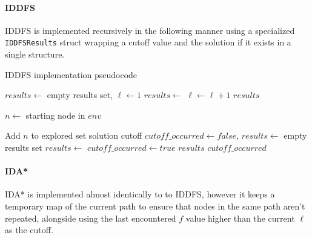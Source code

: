\paragraph{IDDFS} %
\label{par:iddfs}
IDDFS is implemented recursively in the following manner using a specialized \texttt{IDDFSResults} struct wrapping a cutoff value and the solution if it exists in a single structure.

\begin{breakablealgorithm}
\caption{IDDFS implementation pseudocode}
\begin{algorithmic}[1]
		\State $results \gets$ empty results set, $\ell \gets 1$
			\State $results \gets$ 
			\State $\ell \gets \ell + 1$
		\EndWhile
		\State \Return $results$
	\EndProcedure

	\State

		\State $n \gets$ starting node in $env$
		\State \Return {}
	\EndProcedure

	\State

		\State Add $n$ to explored set
		 \Return solution \EndIf
		 \Return cutoff \EndIf
		\State $\mathit{cutoff\_occurred} \gets false$, $results \gets$ empty results set
				\State $results \gets$ 
					$\mathit{cutoff\_occurred} \gets true$
					\Return $results$
				\EndIf
			\EndIf
		\EndFor
		\State \Return $\mathit{cutoff\_occurred}$
	\EndProcedure
\end{algorithmic}
\end{breakablealgorithm}

\paragraph{IDA*} %
\label{par:ida_}
IDA* is implemented almost identically to to IDDFS, however it keeps a temporary map of the current path to ensure that nodes in the same path aren't repeated, alongside using the last encountered $f$ value higher than the current $\ell$ as the cutoff.

